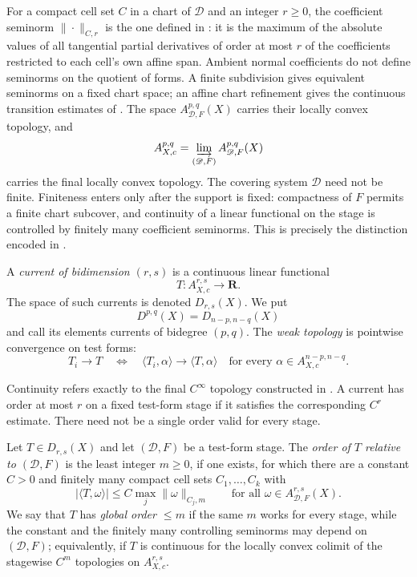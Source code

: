 For a compact cell set $C$ in a chart of $\mathscr D$ and an integer
$r\ge0$, the coefficient seminorm $\|\cdot\|_{C,r}$ is the one defined in
: it is the maximum of the absolute values of all
tangential partial derivatives of order at most $r$ of the coefficients
restricted to each cell's own affine span. Ambient normal coefficients do
not define seminorms on the quotient of forms. A finite subdivision gives
equivalent seminorms on a fixed chart space; an affine chart refinement
gives the continuous transition estimates of .  The space
$A_{\mathscr D,F}^{p,q}(X)$ carries their locally convex topology, and
\[
 A_{X,c}^{p,q}=\varinjlim_{(\mathscr D,F)}A_{\mathscr D,F}^{p,q}(X)
\]
carries the final locally convex topology.  The covering system
$\mathscr D$ need not be finite.  Finiteness enters only after the support is
fixed: compactness of $F$ permits a finite chart subcover, and continuity of
a linear functional on the stage is controlled by finitely many coefficient
seminorms.  This is precisely the distinction encoded in
.

\begin{definition}
\label{def:ch14-current}
A \emph{current of bidimension $(r,s)$} is a continuous linear functional
\[
                     T:A_{X,c}^{r,s}\longrightarrow\mathbf R.
\]
The space of such currents is denoted $D_{r,s}(X)$.  We put
\[
                    D^{p,q}(X)=D_{n-p,n-q}(X)
\]
and call its elements currents of bidegree $(p,q)$.  The \emph{weak
topology} is pointwise convergence on test forms:
\[
 T_i\longrightarrow T
 \quad\Longleftrightarrow\quad
 \langle T_i,\alpha\rangle\longrightarrow\langle T,\alpha\rangle
 \quad\text{for every }\alpha\in A_{X,c}^{n-p,n-q}.
\]
\end{definition}

Continuity refers exactly to the final $C^\infty$ topology constructed in
.  A current has order at most $r$ on a fixed test-form
stage if it satisfies the corresponding $C^r$ estimate.  There need not be a
single order valid for every stage.

\begin{definition}
\label{def:ch14-relative-order}
Let $T\in D_{r,s}(X)$ and let $(\mathscr D,F)$ be a test-form stage.  The
\emph{order of $T$ relative to $(\mathscr D,F)$} is the least integer
$m\ge0$, if one exists, for which there are a constant $C>0$ and finitely many
compact cell sets $C_1,\ldots,C_k$ with
\begin{equation}
\label{eq:ch14-order-bound}
 |\langle T,\omega\rangle|\le C\max_j\|\omega\|_{C_j,m}
 \qquad\text{for all }\omega\in A_{\mathscr D,F}^{r,s}(X).
\end{equation}
We say that $T$ has \emph{global order $\le m$} if the same $m$ works for
every stage, while the constant and the finitely many controlling seminorms
may depend on $(\mathscr D,F)$; equivalently, if $T$ is continuous for the
locally convex colimit of the stagewise $C^m$ topologies on
$A_{X,c}^{r,s}$.
\end{definition}

